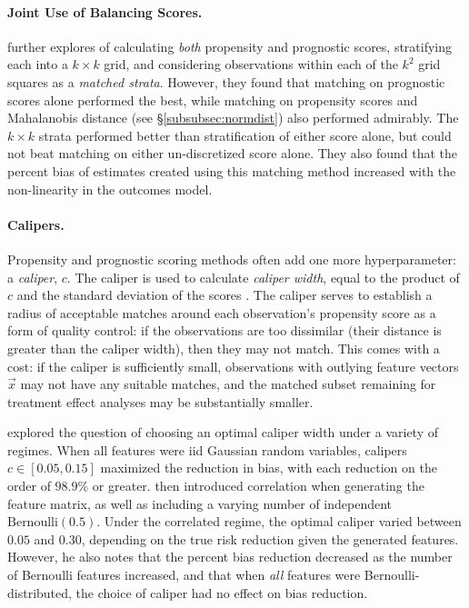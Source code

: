 \documentclass[11pt]{extarticle}
\begin{document}
\paragraph{Joint Use of Balancing Scores.} \textcite{leacy_joint_2014} further explores of calculating \emph{both} propensity and prognostic scores, stratifying each into a $k \times k$ grid, and considering observations within each of the $k^2$ grid squares as a \emph{matched strata}. However, they found that matching on prognostic scores alone performed the best, while matching on propensity scores and Mahalanobis distance (see \S\ref{subsubsec:normdist}) also performed admirably. The $k \times k$ strata performed better than stratification of either score alone, but could not beat matching on either un-discretized score alone. They also found that the percent bias of estimates created using this matching method increased with the non-linearity in the outcomes model.

\paragraph{Calipers.} Propensity and prognostic scoring methods often add one more hyperparameter: a \emph{caliper}, $c$. The caliper is used to calculate \emph{caliper width}, equal to the product of $c$ and the standard deviation of the scores \parencite{ho_matchit_2011}.
The caliper serves to establish a radius of acceptable matches around each observation's propensity score as a form of quality control: if the observations are too dissimilar (their distance is greater than the caliper width), then they may not match.
This comes with a cost: if the caliper is sufficiently small, observations with outlying feature vectors $\vec{x}$ may not have any suitable matches, and the matched subset remaining for treatment effect analyses may be substantially smaller.

\textcite{austin_optimal_2011} explored the question of choosing an optimal caliper width under a variety of regimes. When all features were iid Gaussian random variables, calipers $c \in [0.05, 0.15]$ maximized the reduction in bias, with each reduction on the order of $98.9\%$ or greater. \citeauthor{austin_optimal_2011} then introduced correlation when generating the feature matrix, as well as including a varying number of independent $\text{Bernoulli}(0.5)$. Under the correlated regime, the optimal caliper varied between $0.05$ and $0.30$, depending on the true risk reduction given the generated features. However, he also notes that the percent bias reduction decreased as the number of Bernoulli features increased, and that when \emph{all} features were Bernoulli-distributed, the choice of caliper had no effect on bias reduction.
\end{document}
